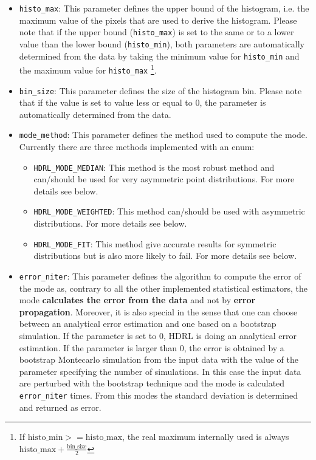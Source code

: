 \begin{itemize}
    
\item \verb+histo_max+: This parameter defines the upper bound of the
  histogram, i.e. the maximum value of the pixels that are used to
  derive the histogram.
  Please note that if the upper bound (\verb+histo_max+) is set to the same or
  to a lower value than the lower bound (\verb+histo_min+), both parameters
  are automatically determined from the data by taking the minimum
  value for \verb+histo_min+ and the maximum value for
  \verb+histo_max+
  \footnote{\label{footnote3}If $\mbox{histo\_min} >= \mbox{histo\_max}$,
  the real maximum internally
  used is always $\mbox{histo\_max} + \frac{\mbox{bin\_size}}{2}$}.
\item \verb+bin_size+: This parameter defines the size of the histogram
  bin. Please note that if the value is set to value less or equal to 0, the parameter is
  automatically determined from the data.
\item \verb+mode_method+: This parameter defines the method used to
  compute the mode. Currently there are three methods implemented with an enum:
  \begin{itemize}
  \item \verb+HDRL_MODE_MEDIAN+: This method is the most robust method
    and can/should be used for very asymmetric point
    distributions. For more details see below.
  \item \verb+HDRL_MODE_WEIGHTED+: This method can/should be used with
    asymmetric distributions. For more details see below.
  \item \verb+HDRL_MODE_FIT+: This method give accurate results for
    symmetric distributions but is also more likely to fail. For more
    details see below.
  \end{itemize}
\item \verb+error_niter+: This parameter defines the algorithm to
  compute the error of the mode as, contrary to all the other
  implemented statistical estimators, the mode \textbf{calculates the
    error from the data} and not by \textbf{error
    propagation}. Moreover, it is also special in the sense that one
  can choose between an analytical error estimation and one based on a
  bootstrap simulation. If the parameter is set to 0, HDRL is doing an
  analytical error estimation. If the parameter is larger than 0,
  the error is obtained by a bootstrap Montecarlo simulation from
  the input data with the value of the parameter specifying the number
  of simulations. In this case the input data are perturbed with the
  bootstrap technique and the mode is calculated \verb+error_niter+
  times. From this modes the standard deviation is determined and
  returned as error.
\end{itemize}

